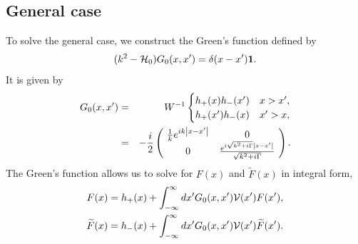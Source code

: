\subsection{General case}
To solve the general case, we construct the Green's function defined by
%
\begin{equation}
	(k^2-{\cal H}_{0})G_{0}(x,x')=\delta(x-x')\mathbf{1}.
\end{equation}
%
It is given by
%
\begin{eqnarray}
	G_{0}(x,x')&=&W^{-1} \begin{cases}
	h_{+}(x)h_{-}(x')  & x>x' , \\ h_{+}(x')h_{-}(x) & x'>x ,
	\end{cases} \\
	&=& -\frac{i}{2} \left(\!\begin{array}{cc}
	\frac{1}{k}e^{ i k \abs{x-x'}} & 0\\
	0 & \frac{e^{ i \sqrt{k^2+i \Gamma} \abs{x-x'}}}{\sqrt{k^2+i \Gamma}} \\
	\end{array}\!\right). \nonumber
\end{eqnarray}
%
The Green's function allows us to solve for   $F(x)$ and $\widetilde{F}(x)$ in integral form,
%
\begin{eqnarray}
	F(x)=h_{+}(x)+\int_{-\infty}^{\infty} dx' G_{0}(x,x') {\cal V}(x') F(x'),
	\nonumber\\
	\widetilde{F}(x)=h_{-}(x)+\int_{-\infty}^{\infty} dx' G_{0}(x,x') {\cal V}(x') \widetilde{F}(x').
	\label{eqf}
\end{eqnarray}


